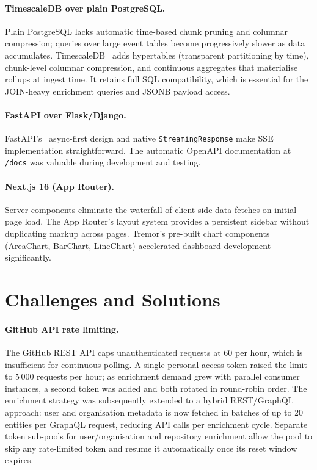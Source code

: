 \documentclass[sigconf]{acmart}
\begin{document}
\paragraph{TimescaleDB over plain PostgreSQL.}
Plain PostgreSQL lacks automatic time-based chunk pruning and columnar
compression; queries over large event tables become progressively slower
as data accumulates. TimescaleDB~\cite{timescaledb} adds hypertables
(transparent partitioning by time), chunk-level columnar compression, and
continuous aggregates that materialise rollups at ingest time. It retains
full SQL compatibility, which is essential for the JOIN-heavy enrichment
queries and JSONB payload access.

\paragraph{FastAPI over Flask/Django.}
FastAPI's~\cite{fastapi} async-first design and native \texttt{StreamingResponse}
make SSE implementation straightforward. The automatic OpenAPI documentation
at \texttt{/docs} was valuable during development and testing.

\paragraph{Next.js 16 (App Router).}
Server components eliminate the waterfall of client-side data fetches on
initial page load. The App Router's layout system provides a persistent
sidebar without duplicating markup across pages. Tremor's pre-built chart
components (AreaChart, BarChart, LineChart) accelerated dashboard development
significantly.
\newpage
\section{Challenges and Solutions}
\label{sec:challenges}

\paragraph{GitHub API rate limiting.}
The GitHub REST API caps unauthenticated requests at 60 per hour, which is
insufficient for continuous polling. A single personal access token raised
the limit to 5\,000 requests per hour; as enrichment demand grew with
parallel consumer instances, a second token was added and both rotated in
round-robin order. The enrichment strategy was subsequently extended to a
hybrid REST/GraphQL approach: user and organisation metadata is now fetched
in batches of up to 20 entities per GraphQL request, reducing API calls per
enrichment cycle. Separate token sub-pools for user/organisation and
repository enrichment allow the pool to skip any rate-limited token and
resume it automatically once its reset window expires.
\end{document}
